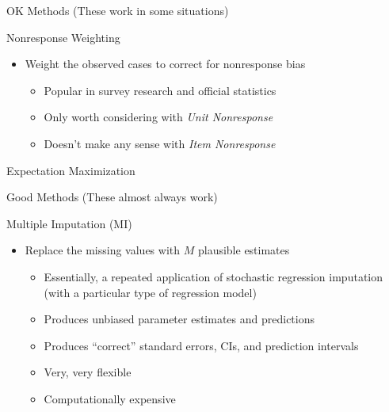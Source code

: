 \documentclass{beamer}\usepackage[]{graphicx}\usepackage[]{color}
\begin{document}
\watermarkon %

\begin{frame}{OK Methods (These work in some situations)}
  
  Nonresponse Weighting
  \vc
  \begin{itemize}
  \item Weight the observed cases to correct for nonresponse bias
    \vc
    \begin{itemize}
    \item Popular in survey research and official statistics
      \vc
    \item Only worth considering with \emph{Unit Nonresponse}
      \vc
    \item Doesn't make any sense with \emph{Item Nonresponse}
    \end{itemize}
  \end{itemize}
  
\end{frame}


\begin{frame}{Expectation Maximization}
  
\end{frame}


\begin{frame}{Good Methods (These almost always work)}
  
  Multiple Imputation (MI)
  \vc
  \begin{itemize}
  \item Replace the missing values with $M$ plausible estimates
    \vc
    \begin{itemize}
    \item Essentially, a repeated application of stochastic regression 
      imputation (with a particular type of regression model)
      \vc
    \item Produces unbiased parameter estimates and predictions
      \vc
    \item Produces ``correct'' standard errors, CIs, and prediction intervals
      \vc
    \item Very, very flexible
      \vc
    \item Computationally expensive
    \end{itemize}
  \end{itemize}
  
\end{frame}
\end{document}
